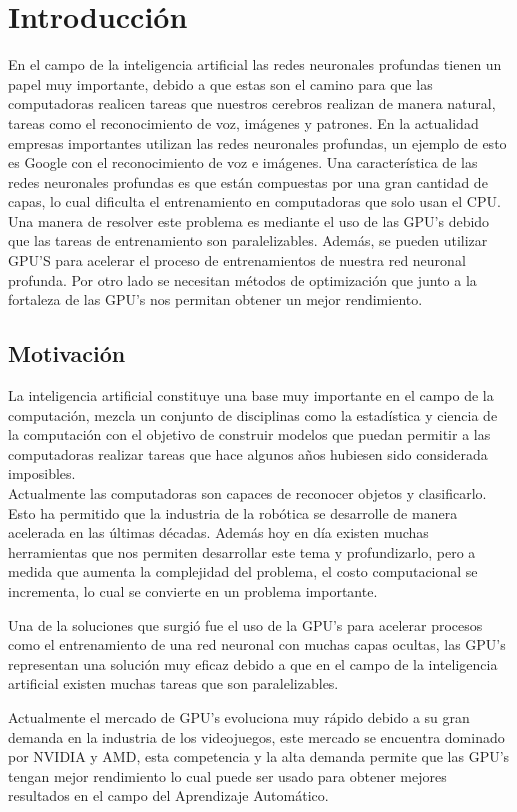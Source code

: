 \chapter{Introducción}
En el campo de la inteligencia artificial las redes neuronales profundas tienen un papel muy importante, debido a que estas son el camino para que las computadoras realicen tareas que nuestros cerebros realizan de manera natural, tareas como el reconocimiento de voz, imágenes y patrones. En la actualidad empresas importantes utilizan las redes neuronales profundas, un ejemplo de esto es Google con el reconocimiento de voz e imágenes. Una característica de las redes neuronales profundas es que están compuestas por una gran cantidad de capas, lo cual dificulta el entrenamiento en computadoras que solo usan el CPU. Una manera de resolver este problema es mediante el uso de las GPU's debido que las tareas de entrenamiento son paralelizables. Además, se pueden utilizar GPU'S para acelerar el proceso de entrenamientos de nuestra red neuronal profunda. Por otro lado se necesitan métodos de optimización que junto a la fortaleza de las GPU's nos permitan obtener un mejor rendimiento.

\section{Motivación}
La inteligencia artificial constituye una base muy importante en el campo de la computación, mezcla un conjunto de disciplinas como la estadística y ciencia de la computación con el objetivo de construir modelos que puedan permitir a las computadoras realizar tareas que hace algunos años hubiesen sido considerada imposibles.\\
Actualmente las computadoras son capaces de reconocer objetos y clasificarlo. Esto ha permitido que la industria de la robótica se desarrolle de manera acelerada en las últimas décadas.
 Además hoy en día existen muchas herramientas que nos permiten desarrollar este tema y profundizarlo, pero a medida que aumenta la complejidad del problema, el costo computacional se incrementa, lo cual se convierte en un problema importante.

 Una de la soluciones que surgió fue el uso de la GPU's para acelerar procesos como el entrenamiento de una red neuronal con muchas capas ocultas, las GPU's representan una solución muy eficaz debido a que en el campo de la inteligencia artificial existen muchas tareas que son paralelizables.

Actualmente el mercado de GPU's evoluciona muy rápido debido a su gran demanda en la industria de los videojuegos, este mercado se encuentra dominado por NVIDIA y AMD, esta competencia y la alta demanda permite que las GPU's tengan mejor rendimiento lo cual puede ser usado para obtener mejores resultados en el campo del Aprendizaje Automático. 

